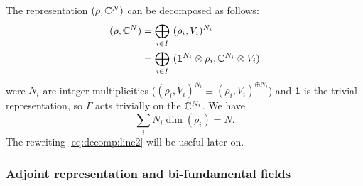             The representation $(\rho,\mathbb{C}^N)$ can be decomposed as follows:
            \begin{align}
                (\rho,\mathbb{C}^N) &= \bigoplus_{i\in I}~(\rho_i,V_i)^{N_i} \label{eq:decomp:line1} \\
                &= \bigoplus_{i\in I}~(\boldsymbol{1}^{N_i}\otimes\rho_i,\mathbb{C}^{N_i}\otimes V_i) \label{eq:decomp:line2}
            \end{align}
            were $N_i$ are integer multiplicities ($(\rho_i,V_i)^{N_i}\equiv(\rho_i,V_i)^{\oplus N_i}$) and $\boldsymbol{1}$ is the trivial representation, so $\Gamma$ acts trivially on the $\mathbb{C}^{N_i}$. We have
            \begin{equation}
                \sum_iN_i\dim(\rho_i)=N.
            \end{equation}
            The rewriting \eqref{eq:decomp:line2} will be useful later on.

        \subsubsection{Adjoint representation and bi-fundamental fields}

